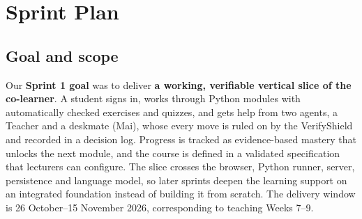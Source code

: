 \documentclass[11pt,a4paper]{article}
\begin{document}
\section{Sprint Plan}
\subsection{Goal and scope}
Our \textbf{Sprint 1 goal} was to deliver \textbf{a working, verifiable vertical slice of the co-learner}. A student signs in, works through Python modules with automatically checked exercises and quizzes, and gets help from two agents, a Teacher and a deskmate (Mai), whose every move is ruled on by the VerifyShield and recorded in a decision log. Progress is tracked as evidence-based mastery that unlocks the next module, and the course is defined in a validated specification that lecturers can configure. The slice crosses the browser, Python runner, server, persistence and language model, so later sprints deepen the learning support on an integrated foundation instead of building it from scratch. The delivery window is 26 October--15 November 2026, corresponding to teaching Weeks 7--9.
\end{document}
